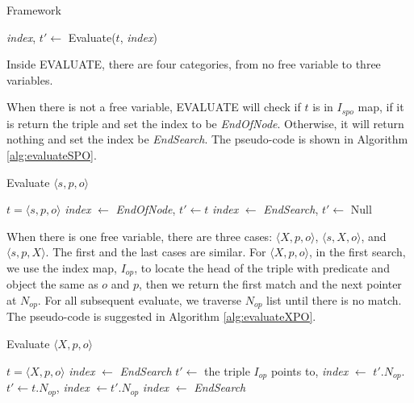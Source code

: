 \documentclass{article}
\begin{document}
\begin{enumerate}
\begin{enumerate}
\begin{algorithm}[H]
\caption{Framework}\label{alg:evaluate}
\begin{algorithmic}

\State \textit{index}, $t' \leftarrow$ Evaluate($t$, \textit{index})
\EndWhile

\end{algorithmic}
\end{algorithm}

Inside EVALUATE, there are four categories, from no free variable to three variables. 

When there is not a free variable, EVALUATE will check if $t$ is in $I_{spo}$ map, if it is return the triple and set the index to be \textit{EndOfNode}. Otherwise, it will return nothing and set the index be \textit{EndSearch}. The pseudo-code is shown in Algorithm \eqref{alg:evaluateSPO}. 

\begin{algorithm}[H]
\caption{Evaluate $\langle s, p, o\rangle$}\label{alg:evaluateSPO}
\begin{algorithmic}
\Require $t = \langle s, p, o\rangle$
\State \textit{index} $\leftarrow$ \textit{EndOfNode}, $t'\leftarrow t$
\Else
\State \textit{index} $\leftarrow$ \textit{EndSearch}, $t'\leftarrow$ Null
\EndIf
\end{algorithmic}
\end{algorithm}

When there is one free variable, there are three cases: $\langle X, p, o\rangle$, $\langle s, X, o\rangle$, and $\langle s, p, X\rangle$. The first and the last cases are similar. For $\langle X, p, o\rangle$, in the first search, we use the index map, $I_{op}$, to locate the head of the triple with predicate and object the same as $o$ and $p$, then we return the first match and the next pointer at $N_{op}$. For all subsequent evaluate, we traverse $N_{op}$ list until there is no match. The pseudo-code is suggested in Algorithm \eqref{alg:evaluateXPO}.
 
\begin{algorithm}[H]
\caption{Evaluate $\langle X, p, o\rangle$}\label{alg:evaluateXPO}
\begin{algorithmic}
\Require $t = \langle X, p, o\rangle$
\State \textit{index} $\leftarrow$ \textit{EndSearch}
\EndIf
{} 
\State $t'\leftarrow$ the triple $I_{op}$ points to, \textit{index} $\leftarrow$ $t'.N_{op}$.
\Else{}
\State $t'\leftarrow t.N_{op}$, \textit{index} $\leftarrow t'.N_{op}$
\EndIf
{}
\State \textit{index} $\leftarrow$ \textit{EndSearch}
\EndIf
\end{algorithmic}
\end{algorithm}


\end{enumerate}
\end{enumerate}
\end{document}
